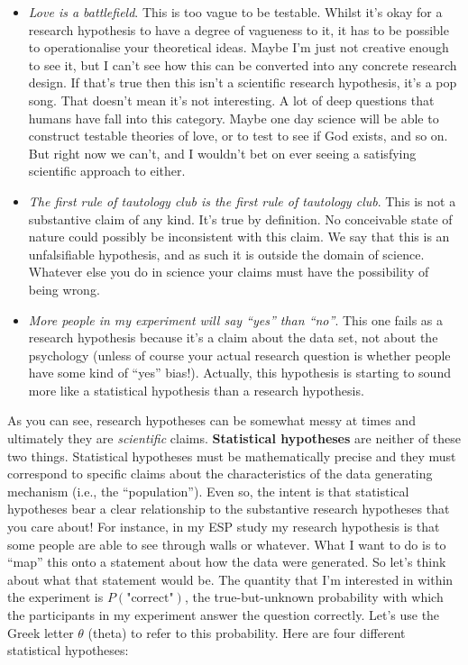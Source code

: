 \documentclass[
]{book}
\providecommand{\tightlist}{%
  \setlength{\itemsep}{0pt}\setlength{\parskip}{0pt}}
\begin{document}
\begin{itemize}
\tightlist
\item
  \emph{Love is a battlefield}. This is too vague to be testable. Whilst it's okay for a research hypothesis to have a degree of vagueness to it, it has to be possible to operationalise your theoretical ideas. Maybe I'm just not creative enough to see it, but I can't see how this can be converted into any concrete research design. If that's true then this isn't a scientific research hypothesis, it's a pop song. That doesn't mean it's not interesting. A lot of deep questions that humans have fall into this category. Maybe one day science will be able to construct testable theories of love, or to test to see if God exists, and so on. But right now we can't, and I wouldn't bet on ever seeing a satisfying scientific approach to either.
\item
  \emph{The first rule of tautology club is the first rule of tautology club}. This is not a substantive claim of any kind. It's true by definition. No conceivable state of nature could possibly be inconsistent with this claim. We say that this is an unfalsifiable hypothesis, and as such it is outside the domain of science. Whatever else you do in science your claims must have the possibility of being wrong.
\item
  \emph{More people in my experiment will say ``yes'' than ``no''}. This one fails as a research hypothesis because it's a claim about the data set, not about the psychology (unless of course your actual research question is whether people have some kind of ``yes'' bias!). Actually, this hypothesis is starting to sound more like a statistical hypothesis than a research hypothesis.
\end{itemize}

As you can see, research hypotheses can be somewhat messy at times and ultimately they are \emph{scientific} claims. {\textbf{Statistical hypotheses}} are neither of these two things. Statistical hypotheses must be mathematically precise and they must correspond to specific claims about the characteristics of the data generating mechanism (i.e., the ``population''). Even so, the intent is that statistical hypotheses bear a clear relationship to the substantive research hypotheses that you care about! For instance, in my ESP study my research hypothesis is that some people are able to see through walls or whatever. What I want to do is to ``map'' this onto a statement about how the data were generated. So let's think about what that statement would be. The quantity that I'm interested in within the experiment is \(P(\mbox{"correct"})\), the true-but-unknown probability with which the participants in my experiment answer the question correctly. Let's use the Greek letter \(\theta\) (theta) to refer to this probability. Here are four different statistical hypotheses:
\end{document}
